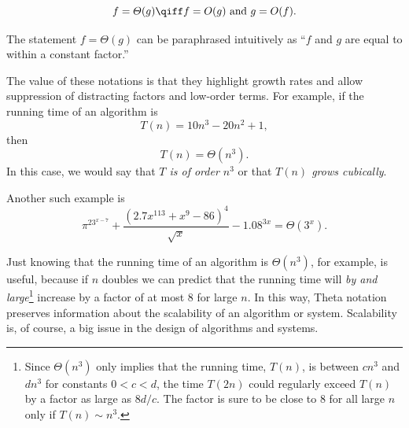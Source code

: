 \begin{definition}
\[
f = \varTheta(g)
\qiff
f=O(g) \text{ and } g=O(f).
\]
\end{definition}

The statement $f = \varTheta(g)$ can be paraphrased intuitively as ``$f$
and $g$ are equal to within a constant factor.''

The value of these notations is that they highlight growth rates and allow
suppression of distracting factors and low-order terms.  For example, if
the running time of an algorithm is
\[
T(n) = 10n^3 - 20n^2 + 1,
\]
then
\[
T(n) = \varTheta(n^3).
\]
In this case, we would say that \emph{$T$ is of order $n^3$} or that
\emph{$T(n)$ grows cubically}.

Another such example is
\[
{{\pi^23^{x-7} + \frac{(2.7x^{113} + x^9- 86)^4}{\sqrt{x}} - 1.08^{3x}}} =
\varTheta(3^x).
\]

Just knowing that the running time of an algorithm is $\varTheta(n^3)$, for
example, is useful, because if $n$ doubles we can predict that the running
time will \emph{by and large}\footnote{Since $\varTheta(n^3)$ only implies
that the running time, $T(n)$, is between $cn^3$ and $dn^3$ for constants
$0<c<d$, the time $T(2n)$ could regularly exceed $T(n)$ by a factor as large
as $8d/c$.  The factor is sure to be close to 8 for all large $n$ only if
$T(n) \sim n^3$.} increase by a factor of at most $8$ for large $n$.  In
this way, Theta notation preserves information about the scalability of an
algorithm or system.  Scalability is, of course, a big issue in the design
of algorithms and systems.

